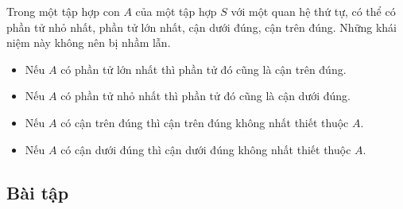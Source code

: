 Trong một tập hợp con $A$ của một tập hợp $S$ với một quan hệ thứ tự, có thể có phần tử nhỏ nhất, phần tử lớn nhất, cận dưới đúng, cận trên đúng. Những khái niệm này không nên bị nhầm lẫn.
\begin{itemize}
    \item Nếu $A$ có phần tử lớn nhất thì phần tử đó cũng là cận trên đúng.
    \item Nếu $A$ có phần tử nhỏ nhất thì phần tử đó cũng là cận dưới đúng.
    \item Nếu $A$ có cận trên đúng thì cận trên đúng không nhất thiết thuộc $A$.
    \item Nếu $A$ có cận dưới đúng thì cận dưới đúng không nhất thiết thuộc $A$.
\end{itemize}

\subsection{Bài tập}
